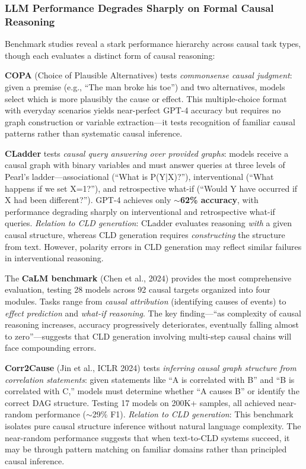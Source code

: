 \subsubsection{LLM Performance Degrades Sharply on Formal Causal Reasoning}

Benchmark studies reveal a stark performance hierarchy across causal task types, though each evaluates a distinct form of causal reasoning:

\textbf{COPA} (Choice of Plausible Alternatives) tests \textit{commonsense causal judgment}: given a premise (e.g., ``The man broke his toe'') and two alternatives, models select which is more plausibly the cause or effect. This multiple-choice format with everyday scenarios yields near-perfect GPT-4 accuracy but requires no graph construction or variable extraction---it tests recognition of familiar causal patterns rather than systematic causal inference.

\textbf{CLadder} \citep{jin2023cladder} tests \textit{causal query answering over provided graphs}: models receive a causal graph with binary variables and must answer queries at three levels of Pearl's ladder---associational (``What is P(Y|X)?''), interventional (``What happens if we set X=1?''), and retrospective what-if (``Would Y have occurred if X had been different?''). GPT-4 achieves only \textbf{$\sim$62\% accuracy}, with performance degrading sharply on interventional and retrospective what-if queries. \textit{Relation to CLD generation}: CLadder evaluates reasoning \textit{with} a given causal structure, whereas CLD generation requires \textit{constructing} the structure from text. However, polarity errors in CLD generation may reflect similar failures in interventional reasoning.

The \textbf{CaLM benchmark} (Chen et al., 2024) provides the most comprehensive evaluation, testing 28 models across 92 causal targets organized into four modules. Tasks range from \textit{causal attribution} (identifying causes of events) to \textit{effect prediction} and \textit{what-if reasoning}. The key finding---``as complexity of causal reasoning increases, accuracy progressively deteriorates, eventually falling almost to zero''---suggests that CLD generation involving multi-step causal chains will face compounding errors.

\textbf{Corr2Cause} (Jin et al., ICLR 2024) tests \textit{inferring causal graph structure from correlation statements}: given statements like ``A is correlated with B'' and ``B is correlated with C,'' models must determine whether ``A causes B'' or identify the correct DAG structure. Testing 17 models on 200K+ samples, all achieved near-random performance ($\sim$29\% F1). \textit{Relation to CLD generation}: This benchmark isolates pure causal structure inference without natural language complexity. The near-random performance suggests that when text-to-CLD systems succeed, it may be through pattern matching on familiar domains rather than principled causal inference.

